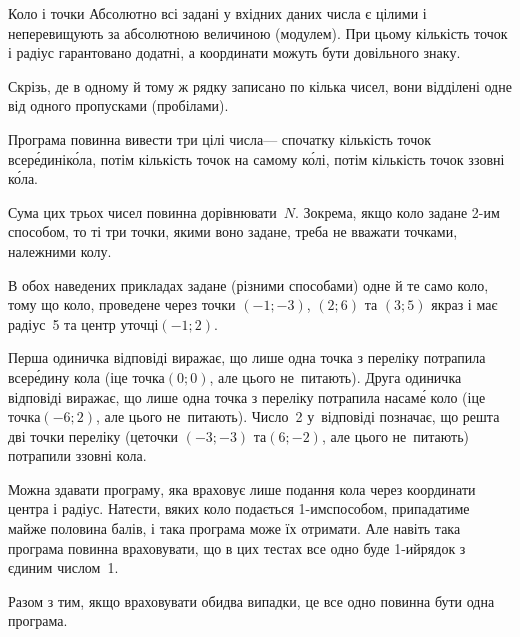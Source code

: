 \documentclass[14pt,a4paper]{extarticle}
\begin{document}
\begin{problemAllDefault}{Коло і точки}
Абсолютно всі задані у вхідних даних числа є цілими і не\nolinebreak[3] перевищують за абсолютною величиною (модулем). При цьому кількість точок і радіус гарантовано додатні, а координати можуть бути довільного знаку.

Скрізь, де в одному й тому ж рядку записано по кілька чисел, вони відділені одне від одного пропусками (пробілами).


\OutputFile Програма повинна вивести три цілі числа\nolinebreak[3] --- спочатку кількість точок всер\'{е}\-дині\nolinebreak[2] к\'{о}ла, потім кількість точок на самому к\'{о}лі, потім кількість точок ззовні к\'{о}ла.

Сума цих трьох чисел повинна дорівнювати~$N$. Зокрема, якщо коло задане \mbox{2-им} способом, то ті три точки, якими воно задане, треба не вважати точками, належними колу.



\Examples
\begin{exampleSimple}{7em}{3em}%
%
%
\end{exampleSimple}

\Notes
В обох наведених прикладах задане (різними способами) одне й те само коло, тому що коло, проведене через точки $(-1; -3)$, $(2; 6)$ та $(3; 5)$ якраз і має радіус~5 та центр у\nolinebreak[3] точці\nolinebreak[3] $(-1; 2)$.

Перша одиничка відповіді виражає, що лише одна точка з переліку потрапила всер\'{е}\-дину кола (і\nolinebreak[3] це точка\nolinebreak[3] $(0; 0)$, але цього не~питають). Друга одиничка відповіді виражає, що лише одна точка з переліку потрапила на\nolinebreak[3] сам\'{е} коло (і\nolinebreak[3] це точка\nolinebreak[3] $(-6; 2)$, але цього не~питають). Число~2 у~відповіді позначає, що решта дві точки переліку (це\nolinebreak[3] точки $(-3; -3)$ та\nolinebreak[3] $(6; -2)$, але цього не~питають) потрапили ззовні кола.

Можна здавати програму, яка враховує лише подання кола через координати центра і радіус. На\nolinebreak[3] тести, в\nolinebreak[3] яких коло подається \mbox{1-им}\nolinebreak[3] способом, припадатиме майже половина балів, і така програма може їх отримати. Але навіть така програма повинна враховувати, що в цих тестах все одно буде \mbox{1-ий}\nolinebreak[3] рядок з єдиним числом~1.

Разом з тим, якщо враховувати обидва випадки, це все одно повинна бути одна програма.

\end{problemAllDefault}
	
\end{document}

